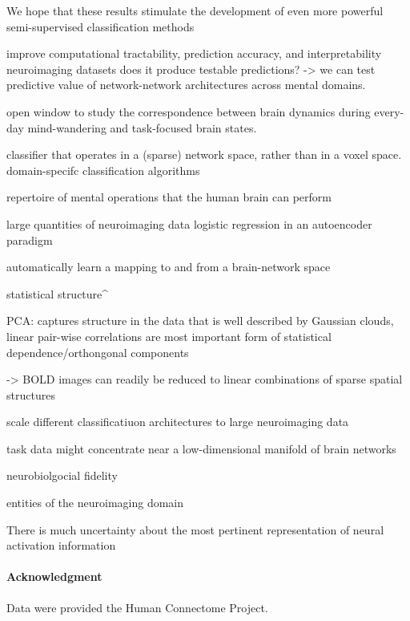 \documentclass{article} %
\begin{document}
We hope that these results stimulate the development of
even more powerful semi-supervised classification methods


improve computational tractability, prediction accuracy, and interpretability
neuroimaging datasets
does it produce testable predictions?
-> we can test predictive value of network-network architectures across
mental domains.

open window to study the correspondence between brain dynamics during
every-day mind-wandering and task-focused brain states.

classifier that operates in a (sparse) network space, rather than in a voxel space.
domain-specifc classification algorithms

repertoire of mental operations that the human brain can perform

large quantities of neuroimaging data
logistic regression in an autoencoder paradigm

automatically learn a mapping to and from a brain-network space

statistical structure^

PCA:
captures structure in the data that is well described by Gaussian clouds,
linear pair-wise correlations are most important form of statistical
dependence/orthongonal components

-> BOLD images can readily be reduced to linear combinations of
sparse spatial structures

scale different classificatiuon architectures to large neuroimaging data

task data might concentrate near a low-dimensional manifold of brain networks

neurobiolgocial fidelity

entities of the neuroimaging domain

There is much uncertainty about the most pertinent representation
of neural activation information

%
\paragraph{Acknowledgment}
{\small
Data were provided the Human Connectome Project.
}


\small


\end{document}

